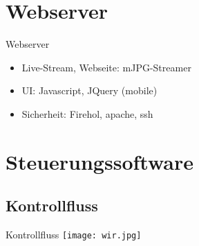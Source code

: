 \documentclass{beamer}
\begin{document}
\section{Webserver} %
\begin{frame}{Webserver}
\begin{itemize}
	\item<1-2,4-> Live-Stream, Webseite: mJPG-Streamer
	\item<2,4-> UI: Javascript, JQuery (mobile)
	\item<4-> Sicherheit: Firehol, apache, ssh
\end{itemize}
\end{frame}


\section{Steuerungssoftware}%
\subsection{Kontrollfluss}
\begin{frame}{Kontrollfluss}
	\texttt{[image: wir.jpg]}
\end{frame}
\end{document}
